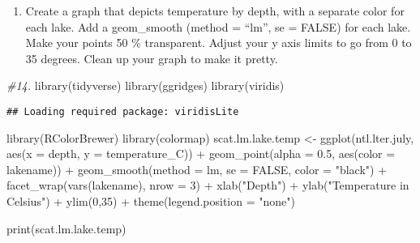 \documentclass[
]{article}
\newenvironment{Shaded}{\begin{snugshade}}{\end{snugshade}}
\newcommand{\AttributeTok}[1]{\textcolor[rgb]{0.77,0.63,0.00}{#1}}
\newcommand{\CommentTok}[1]{\textcolor[rgb]{0.56,0.35,0.01}{\textit{#1}}}
\newcommand{\ConstantTok}[1]{\textcolor[rgb]{0.00,0.00,0.00}{#1}}
\newcommand{\DecValTok}[1]{\textcolor[rgb]{0.00,0.00,0.81}{#1}}
\newcommand{\FloatTok}[1]{\textcolor[rgb]{0.00,0.00,0.81}{#1}}
\newcommand{\FunctionTok}[1]{\textcolor[rgb]{0.00,0.00,0.00}{#1}}
\newcommand{\NormalTok}[1]{#1}
\newcommand{\OtherTok}[1]{\textcolor[rgb]{0.56,0.35,0.01}{#1}}
\newcommand{\SpecialCharTok}[1]{\textcolor[rgb]{0.00,0.00,0.00}{#1}}
\newcommand{\StringTok}[1]{\textcolor[rgb]{0.31,0.60,0.02}{#1}}
\providecommand{\tightlist}{%
  \setlength{\itemsep}{0pt}\setlength{\parskip}{0pt}}
\begin{document}
\begin{enumerate}
\def\labelenumi{\arabic{enumi}.}
\setcounter{enumi}{13}
\tightlist
\item
  Create a graph that depicts temperature by depth, with a separate
  color for each lake. Add a geom\_smooth (method = ``lm'', se = FALSE)
  for each lake. Make your points 50 \% transparent. Adjust your y axis
  limits to go from 0 to 35 degrees. Clean up your graph to make it
  pretty.
\end{enumerate}

\begin{Shaded}
\begin{Highlighting}[]
\CommentTok{\#14.}
\FunctionTok{library}\NormalTok{(tidyverse)}
\FunctionTok{library}\NormalTok{(ggridges)}
\FunctionTok{library}\NormalTok{(viridis)}
\end{Highlighting}
\end{Shaded}

\begin{verbatim}
## Loading required package: viridisLite
\end{verbatim}

\begin{Shaded}
\begin{Highlighting}[]
\FunctionTok{library}\NormalTok{(RColorBrewer)}
\FunctionTok{library}\NormalTok{(colormap)}
\NormalTok{scat.lm.lake.temp }\OtherTok{\textless{}{-}} \FunctionTok{ggplot}\NormalTok{(ntl.lter.july, }
                            \FunctionTok{aes}\NormalTok{(}\AttributeTok{x =}\NormalTok{ depth, }\AttributeTok{y =}\NormalTok{ temperature\_C)) }\SpecialCharTok{+}
  \FunctionTok{geom\_point}\NormalTok{(}\AttributeTok{alpha =} \FloatTok{0.5}\NormalTok{, }\FunctionTok{aes}\NormalTok{(}\AttributeTok{color =}\NormalTok{ lakename)) }\SpecialCharTok{+}
  \FunctionTok{geom\_smooth}\NormalTok{(}\AttributeTok{method =}\NormalTok{ lm, }\AttributeTok{se =} \ConstantTok{FALSE}\NormalTok{, }\AttributeTok{color =} \StringTok{"black"}\NormalTok{) }\SpecialCharTok{+}
  \FunctionTok{facet\_wrap}\NormalTok{(}\FunctionTok{vars}\NormalTok{(lakename), }\AttributeTok{nrow =} \DecValTok{3}\NormalTok{) }\SpecialCharTok{+}
  \FunctionTok{xlab}\NormalTok{(}\StringTok{"Depth"}\NormalTok{) }\SpecialCharTok{+}
  \FunctionTok{ylab}\NormalTok{(}\StringTok{"Temperature in Celsius"}\NormalTok{) }\SpecialCharTok{+}
  \FunctionTok{ylim}\NormalTok{(}\DecValTok{0}\NormalTok{,}\DecValTok{35}\NormalTok{) }\SpecialCharTok{+}
  \FunctionTok{theme}\NormalTok{(}\AttributeTok{legend.position =} \StringTok{"none"}\NormalTok{)}
  
\FunctionTok{print}\NormalTok{(scat.lm.lake.temp)}
\end{Highlighting}
\end{Shaded}
\end{document}
